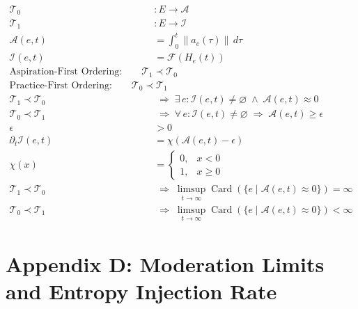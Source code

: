 \documentclass[11pt,oneside]{article}
\begin{document}
\begin{align}
\mathcal{T}_0 &: E \rightarrow \mathcal{A} \\[6pt]
\mathcal{T}_1 &: E \rightarrow \mathcal{I} \\[10pt]

\mathcal{A}(e,t) &= \int_0^t \|a_e(\tau)\| \, d\tau \\[10pt]

\mathcal{I}(e,t) &= \mathcal{F}\!\left(H_e(t)\right) \\[10pt]

\text{Aspiration-First Ordering:} \qquad
\mathcal{T}_1 \prec \mathcal{T}_0
\\[6pt]

\text{Practice-First Ordering:} \qquad
\mathcal{T}_0 \prec \mathcal{T}_1
\\[12pt]

\mathcal{T}_1 \prec \mathcal{T}_0
&\;\Longrightarrow\;
\exists\, e :
\mathcal{I}(e,t) \neq \varnothing \;\wedge\; \mathcal{A}(e,t) \approx 0
\\[12pt]

\mathcal{T}_0 \prec \mathcal{T}_1
&\;\Longrightarrow\;
\forall\, e :
\mathcal{I}(e,t) \neq \varnothing
\;\Rightarrow\;
\mathcal{A}(e,t) \ge \epsilon
\\[12pt]

\epsilon &> 0 \\[10pt]

\partial_t \mathcal{I}(e,t)
&= \chi\!\left(\mathcal{A}(e,t) - \epsilon\right)
\\[12pt]

\chi(x) &=
\begin{cases}
0, & x < 0 \\[4pt]
1, & x \ge 0
\end{cases}
\\[12pt]

\mathcal{T}_1 \prec \mathcal{T}_0
&\;\Longrightarrow\;
\limsup_{t \to \infty}
\operatorname{Card}\!\left(
\{ e \mid \mathcal{A}(e,t) \approx 0 \}
\right)
= \infty
\\[12pt]

\mathcal{T}_0 \prec \mathcal{T}_1
&\;\Longrightarrow\;
\limsup_{t \to \infty}
\operatorname{Card}\!\left(
\{ e \mid \mathcal{A}(e,t) \approx 0 \}
\right)
< \infty
\end{align}

\section{Appendix D: Moderation Limits and Entropy Injection Rate}
\end{document}
